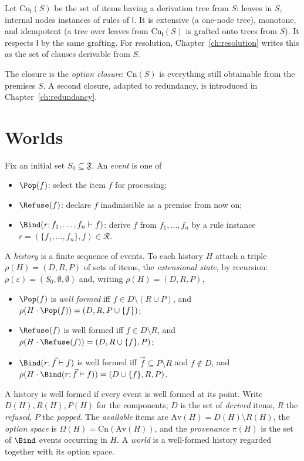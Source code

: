 \begin{example}
\label{ex:dercl}
Let $\mathrm{Cn}_{\mathsf I}(S)$ be the set of items having a derivation tree from $S$: leaves in $S$, internal nodes instances of rules of $\mathsf I$. It is extensive (a one-node tree), monotone, and idempotent (a tree over leaves from $\mathrm{Cn}_{\mathsf I}(S)$ is grafted onto trees from $S$). It respects $\mathsf I$ by the same grafting. For resolution, Chapter~\ref{ch:resolution} writes this as the set of clauses derivable from $S$.
\end{example}

The closure is the \emph{option closure}: $\mathrm{Cn}(S)$ is everything still obtainable from the premises $S$. A second closure, adapted to redundancy, is introduced in Chapter~\ref{ch:redundancy}.

\section{Worlds}

\begin{definition}
\label{def:world}
Fix an initial set $S_0\subseteq\mathfrak F$. An \emph{event} is one of
\begin{itemize}[nosep]
\item $\Pop(f)$: select the item $f$ for processing;
\item $\Refuse(f)$: declare $f$ inadmissible as a premise from now on;
\item $\Bind(r;f_1,\dots,f_n\vdash f)$: derive $f$ from $f_1,\dots,f_n$ by a rule instance $r=(\{f_1,\dots,f_n\},f)\in\mathcal R$.
\end{itemize}
A \emph{history} is a finite sequence of events. To each history $H$ attach a triple $\rho(H)=(D,R,P)$ of sets of items, the \emph{extensional state}, by recursion: $\rho(\varepsilon)=(S_0,\emptyset,\emptyset)$ and, writing $\rho(H)=(D,R,P)$,
\begin{itemize}[nosep]
\item $\Pop(f)$ is \emph{well formed} iff $f\in D\setminus(R\cup P)$, and $\rho(H\cdot\Pop(f))=(D,R,P\cup\{f\})$;
\item $\Refuse(f)$ is well formed iff $f\in D\setminus R$, and $\rho(H\cdot\Refuse(f))=(D,R\cup\{f\},P)$;
\item $\Bind(r;\vec f\vdash f)$ is well formed iff $\vec f\subseteq P\setminus R$ and $f\notin D$, and $\rho(H\cdot\Bind(r;\vec f\vdash f))=(D\cup\{f\},R,P)$.
\end{itemize}
A history is well formed if every event is well formed at its point. Write $D(H),R(H),P(H)$ for the components; $D$ is the set of \emph{derived} items, $R$ the \emph{refused}, $P$ the \emph{popped}. The \emph{available} items are $\mathrm{Av}(H)=D(H)\setminus R(H)$, the \emph{option space} is $\Omega(H)=\mathrm{Cn}(\mathrm{Av}(H))$, and the \emph{provenance} $\pi(H)$ is the set of $\Bind$ events occurring in $H$. A \emph{world} is a well-formed history regarded together with its option space.
\end{definition}

